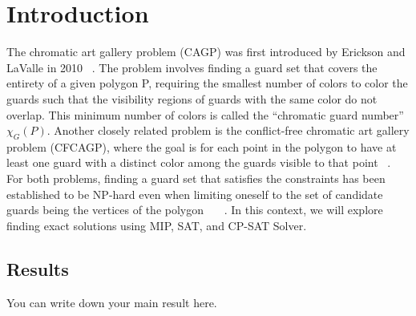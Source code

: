 \chapter{Introduction}
The chromatic art gallery problem (CAGP) was first introduced by Erickson and LaValle in 2010 ~\cite{erickson2010chromatic}. The problem involves finding a guard set that covers the entirety of a given polygon P, requiring the smallest number of colors to color the guards such that the visibility regions of guards with the same color do not overlap. This minimum number of colors is called the ``chromatic guard number'' $\chi_G(P)$. Another closely related problem is the conflict-free chromatic art gallery problem (CFCAGP), where the goal is for each point in the polygon to have at least one guard with a distinct color among the guards visible to that point ~\cite{bartschi2014conflict}. For both problems, finding a guard set that satisfies the constraints has been established to be NP-hard even when limiting oneself to the set of candidate guards being the vertices of the polygon ~\cite{fekete2014chromatic}~\cite{erickson2011many}~\cite{iwamoto2022vertex}. In this context, we will explore finding exact solutions using MIP, SAT, and CP-SAT Solver.

\section{Results}
You can write down your main result here.

